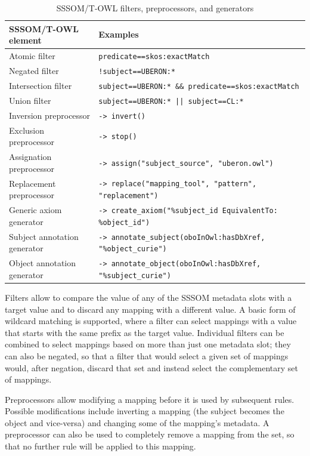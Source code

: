 \documentclass{ceurart}
\begin{document}
\begin{table}
  \caption{SSSOM/T-OWL filters, preprocessors, and generators}
  \label{tab:sssomt}
  \begin{tabular}{ll}
    \toprule
    SSSOM/T-OWL element & Examples\\
    \midrule
    Atomic filter & \verb|predicate==skos:exactMatch|\\
    Negated filter & \verb|!subject==UBERON:*|\\
    Intersection filter & \verb|subject==UBERON:* && predicate==skos:exactMatch|\\
    Union filter & \verb+subject==UBERON:* || subject==CL:*+\\
    \midrule
    Inversion preprocessor & \verb|-> invert()|\\
    Exclusion preprocessor & \verb|-> stop()|\\
    Assignation preprocessor & \verb|-> assign("subject_source", "uberon.owl")|\\
    Replacement preprocessor & \verb|-> replace("mapping_tool", "pattern", "replacement")|\\
    \midrule
    Generic axiom generator & \verb|-> create_axiom("%subject_id EquivalentTo: %object_id")|\\
    Subject annotation generator & \verb|-> annotate_subject(oboInOwl:hasDbXref, "%object_curie")|\\
    Object annotation generator & \verb|-> annotate_object(oboInOwl:hasDbXref, "%subject_curie")|\\
    \bottomrule
  \end{tabular}
\end{table}

Filters allow to compare the value of any of the SSSOM metadata slots
with a target value and to discard any mapping with a different value. A
basic form of wildcard matching is supported, where a filter can select
mappings with a value that starts with the same prefix as the target
value. Individual filters can be combined to select mappings based on
more than just one metadata slot; they can also be negated, so that a
filter that would select a given set of mappings would, after negation,
discard that set and instead select the complementary set of mappings.

Preprocessors allow modifying a mapping before it is used by subsequent
rules. Possible modifications include inverting a mapping (the subject
becomes the object and vice-versa) and changing some of the mapping's
metadata. A preprocessor can also be used to completely remove a mapping
from the set, so that no further rule will be applied to this mapping.
\end{document}
